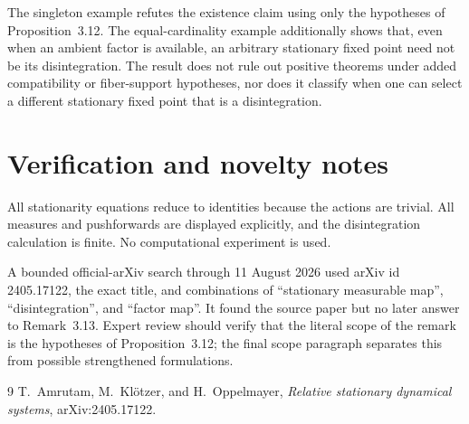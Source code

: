 \documentclass[11pt]{article}
\begin{document}
The singleton example refutes the existence claim using only the hypotheses
of Proposition~3.12.  The equal-cardinality example additionally shows that,
even when an ambient factor is available, an arbitrary stationary fixed point
need not be its disintegration.  The result does not rule out positive
theorems under added compatibility or fiber-support hypotheses, nor does it
classify when one can select a different stationary fixed point that is a
disintegration.

\section{Verification and novelty notes}

All stationarity equations reduce to identities because the actions are
trivial.  All measures and pushforwards are displayed explicitly, and the
disintegration calculation is finite.  No computational experiment is used.

A bounded official-arXiv search through 11 August 2026 used arXiv id
2405.17122, the exact title, and combinations of ``stationary measurable
map'', ``disintegration'', and ``factor map''.  It found the source paper but
no later answer to Remark~3.13.  Expert review should verify that the literal
scope of the remark is the hypotheses of Proposition~3.12; the final scope
paragraph separates this from possible strengthened formulations.

\begin{thebibliography}{9}
T.~Amrutam, M.~Kl\"otzer, and H.~Oppelmayer,
\emph{Relative stationary dynamical systems}, arXiv:2405.17122.
\end{thebibliography}
\end{document}
